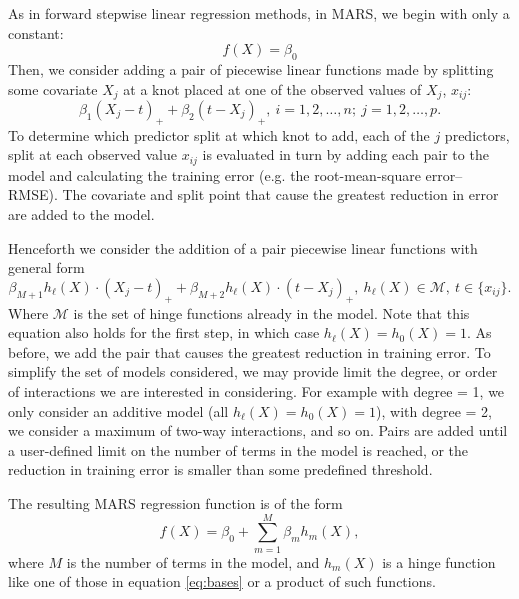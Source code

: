 \documentclass[12pt]{article}
\begin{document}
As in forward stepwise linear regression methods, in MARS,  we begin with only a constant:
\begin{equation}
  f(X) = \beta_{0}
\end{equation}
Then, we consider adding a pair of piecewise linear functions made by splitting some covariate $X_{j}$ at a knot placed at one of the observed values of $X_{j}$, $x_{ij}$:
\begin{equation}
\beta_{1} (X_{j} - t)_{+} + \beta_{2}(t - X_{j})_{+}, \ i = 1, 2, \ldots, n; \ j = 1, 2, \ldots, p.
\end{equation}
To determine which predictor split at which knot to add, each of the $j$ predictors, split at each observed value $x_{ij}$ is evaluated in turn by adding each pair to the model and calculating the training error (e.g. the root-mean-square error--RMSE). The covariate and split point that cause the greatest reduction in error are added to the model.

Henceforth we consider the addition of a pair piecewise linear functions with general form
\begin{equation} \label{eq:gen-pairs-add}
  \beta_{M + 1} h_{\ell}(X) \cdot (X_{j} - t)_{+} + \beta_{M + 2} h_{\ell}(X) \cdot (t - X_{j})_{+}, \ h_{\ell}(X) \in \mathcal{M}, \ t \in \{x_{ij}\}.
\end{equation}
Where $\mathcal{M}$ is the set of hinge functions already in the model. Note that this equation also holds for the first step, in which case $h_{\ell}(X) = h_{0}(X) = 1$. As before, we add the pair that causes the greatest reduction in training error. To simplify the set of models considered, we may provide limit the degree, or order of interactions we are interested in considering. For example with degree = 1, we only consider an additive model (all $h_{\ell}(X) = h_{0}(X) = 1$), with degree = 2, we consider a maximum of two-way interactions, and so on.
Pairs are added until a user-defined limit on the number of terms in the model is reached, or the reduction in training error is smaller than some predefined threshold.

The resulting MARS regression function is of the form
\begin{equation}
  f(X) = \beta_{0} + \sum_{m = 1}^{M} \beta_{m} h_{m}(X),
\end{equation}
where $M$ is the number of terms in the model, and $h_{m}(X)$ is a hinge function like one of those in equation \ref{eq:bases} or a product of such functions.

\end{document}
